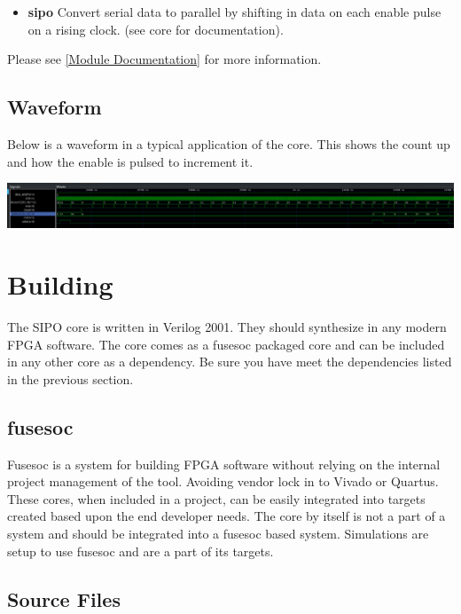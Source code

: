 \begin{itemize}
  \item \textbf{sipo} Convert serial data to parallel by shifting in data on each enable pulse on a rising clock. (see core for documentation).
\end{itemize}

Please see \ref{Module Documentation} for more information.

\subsection{Waveform}
Below is a waveform in a typical application of the core. This shows the count up and how the enable is pulsed to increment it.

\includegraphics[width=\textwidth]{img/diagrams/waveform.png}

\section{Building}

\par
The SIPO core is written in Verilog 2001. They should synthesize in any modern FPGA software. The core comes as a fusesoc packaged core and can be included in any other core as a dependency. Be sure you have meet the dependencies listed in the previous section.

\subsection{fusesoc}
\par
Fusesoc is a system for building FPGA software without relying on the internal project management of the tool. Avoiding vendor lock in to Vivado or Quartus.
These cores, when included in a project, can be easily integrated into targets created based upon the end developer needs. The core by itself is not a part of
a system and should be integrated into a fusesoc based system. Simulations are setup to use fusesoc and are a part of its targets.

\subsection{Source Files}




